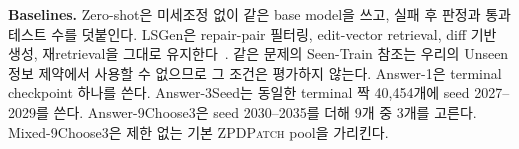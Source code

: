 \documentclass[10pt,conference]{IEEEtran}
\begin{document}
\noindent\textbf{Baselines.} Zero-shot은 미세조정 없이 같은 base model을 쓰고, 실패 후 판정과 통과 테스트 수를 덧붙인다. LSGen은 repair-pair 필터링, edit-vector retrieval, diff 기반 생성, 재retrieval을 그대로 유지한다~\cite{dai2026learner}. 같은 문제의 Seen-Train 참조는 우리의 Unseen 정보 제약에서 사용할 수 없으므로 그 조건은 평가하지 않는다. Answer-1은 terminal checkpoint 하나를 쓴다. Answer-3Seed는 동일한 terminal 짝 40,454개에 seed 2027--2029를 쓴다. Answer-9Choose3은 seed 2030--2035를 더해 9개 중 3개를 고른다. Mixed-9Choose3은 제한 없는 기본 \textsc{ZPDPatch} pool을 가리킨다.
\end{document}

